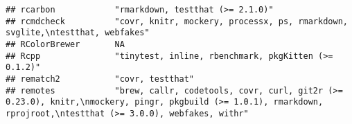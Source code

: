 \documentclass[
]{article}
\begin{document}
\begin{verbatim}
## rcarbon            "rmarkdown, testthat (>= 2.1.0)"                                                                                                                                                                                                                                                                                                                                                                                                                                                  
## rcmdcheck          "covr, knitr, mockery, processx, ps, rmarkdown, svglite,\ntestthat, webfakes"                                                                                                                                                                                                                                                                                                                                                                                                     
## RColorBrewer       NA                                                                                                                                                                                                                                                                                                                                                                                                                                                                                
## Rcpp               "tinytest, inline, rbenchmark, pkgKitten (>= 0.1.2)"                                                                                                                                                                                                                                                                                                                                                                                                                              
## rematch2           "covr, testthat"                                                                                                                                                                                                                                                                                                                                                                                                                                                                  
## remotes            "brew, callr, codetools, covr, curl, git2r (>= 0.23.0), knitr,\nmockery, pingr, pkgbuild (>= 1.0.1), rmarkdown, rprojroot,\ntestthat (>= 3.0.0), webfakes, withr"                                                                                                                                                                                                                                                                                                                 

\end{verbatim}
\end{document}
